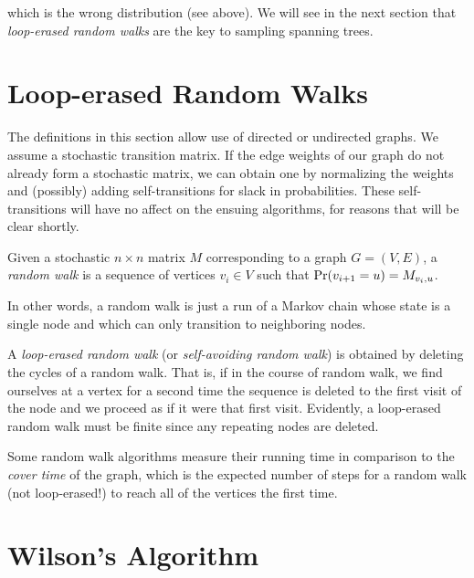 \documentclass[11pt]{article}
\begin{document}
which is the wrong distribution (see above). We will see in the next section that
\emph{loop-erased random walks} are the key to sampling spanning trees.

\section{Loop-erased Random Walks}

The definitions in this section allow use of directed or undirected graphs. We
assume a stochastic transition matrix. If the edge weights of our graph do not
already form a stochastic matrix, we can obtain one by normalizing the weights
and (possibly) adding self-transitions for slack in probabilities. These
self-transitions will have no affect on the ensuing algorithms, for reasons that
will be clear shortly.

\begin{defn}
Given a stochastic $n\times n$ matrix $M$ corresponding to a graph $G = (V, E)$,
a \emph{random walk} is a sequence of vertices $v_i \in V$ such that
$\text{Pr}(v_{i+1} = u) = M_{v_i,u}$.
\end{defn}

In other words, a random walk is just a run of a Markov chain whose state is a
single node and which can only transition to neighboring nodes.

A \emph{loop-erased random walk} (or \emph{self-avoiding random walk}) is
obtained by deleting the cycles of a random walk. That is, if in the course of
random walk, we find ourselves at a vertex for a second time the sequence is
deleted to the first visit of the node and we proceed as if it were that first
visit. Evidently, a loop-erased random walk must be finite since any repeating
nodes are deleted.

Some random walk algorithms measure their running time in
comparison to the \emph{cover time} of the graph, which is the expected number
of steps for a random walk (not loop-erased!) to reach all of the vertices the
first time.


\section{Wilson's Algorithm}\label{wilson}
\end{document}

